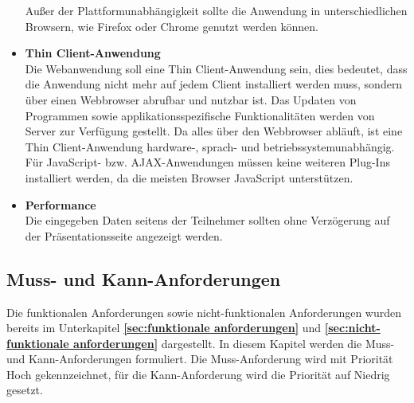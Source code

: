 \begin{itemize}
Außer der Plattformunabhängigkeit sollte die Anwendung in unterschiedlichen Browsern, wie Firefox oder Chrome genutzt werden können.
\item \textbf{Thin Client-Anwendung}\\
Die Webanwendung soll eine Thin Client-Anwendung sein, dies bedeutet, dass die Anwendung nicht mehr auf jedem Client installiert werden muss, sondern über einen Webbrowser abrufbar und nutzbar ist. Das Updaten von Programmen sowie applikationsspezifische Funktionalitäten werden von Server zur Verfügung gestellt. Da alles über den Webbrowser abläuft, ist eine Thin Client-Anwendung hardware-, sprach- und betriebssystemunabhängig. Für JavaScript- bzw. AJAX-Anwendungen müssen keine weiteren Plug-Ins installiert werden, da die meisten Browser JavaScript unterstützen. 
\item \textbf{Performance}\\
Die eingegeben Daten seitens der Teilnehmer sollten ohne Verzögerung auf der Präsentationsseite angezeigt werden.
\end{itemize}

\subsection{Muss- und Kann-Anforderungen}
\label{muss- und kann-Anforderungen}
Die funktionalen Anforderungen sowie nicht-funktionalen Anforderungen wurden bereits im Unterkapitel \textbf{\ref{sec:funktionale anforderungen}} und \textbf{\ref{sec:nicht-funktionale anforderungen}} dargestellt. In diesem Kapitel werden die Muss- und Kann-Anforderungen formuliert. Die Muss-Anforderung wird mit Priorität \glqq Hoch\grqq{} gekennzeichnet, für die Kann-Anforderung wird die Priorität auf \glqq Niedrig\grqq{} gesetzt.

